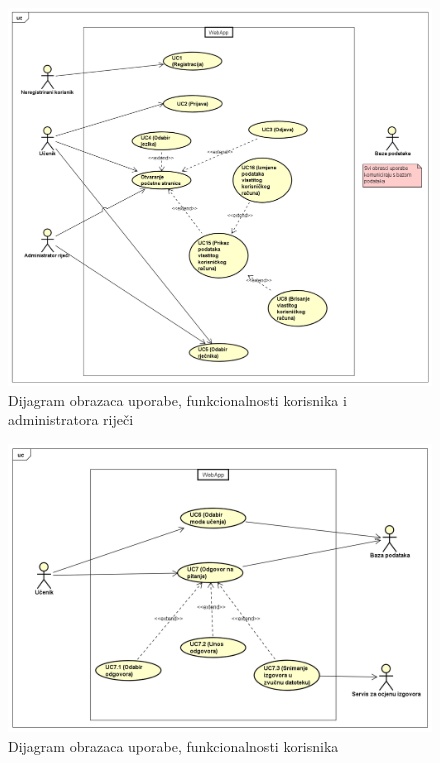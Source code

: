 
					\begin{figure}[H]
						\includegraphics[width=\textwidth]{slike/UseCaseDiagram0.PNG}
						\caption{Dijagram obrazaca uporabe, funkcionalnosti korisnika i administratora riječi}
						\label{fig:useCaseDiagram0}
					\end{figure}
					
					\begin{figure}[H]
						\includegraphics[width=\textwidth]{slike/UseCaseDiagram1.PNG}
						\caption{Dijagram obrazaca uporabe, funkcionalnosti korisnika}
						\label{fig:useCaseDiagram1}
					\end{figure}
					
